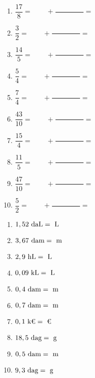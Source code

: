 \documentclass[a4paper,11pt,fleqn]{article}
\begin{document}

\begin{multicols}{2}
\begin{enumerate}[itemsep=2em]
	\item $ \dfrac{17}{8} = \phantom{0000} + \dfrac{\phantom{00000000}}{} =  $
	\item $ \dfrac{3}{2} = \phantom{0000} + \dfrac{\phantom{00000000}}{} =  $
	\item $ \dfrac{14}{5} = \phantom{0000} + \dfrac{\phantom{00000000}}{} =  $
	\item $ \dfrac{5}{4} = \phantom{0000} + \dfrac{\phantom{00000000}}{} =  $
	\item $ \dfrac{7}{4} = \phantom{0000} + \dfrac{\phantom{00000000}}{} =  $
	\item $ \dfrac{43}{10} = \phantom{0000} + \dfrac{\phantom{00000000}}{} =  $
	\item $ \dfrac{15}{4} = \phantom{0000} + \dfrac{\phantom{00000000}}{} =  $
	\item $ \dfrac{11}{5} = \phantom{0000} + \dfrac{\phantom{00000000}}{} =  $
	\item $ \dfrac{47}{10} = \phantom{0000} + \dfrac{\phantom{00000000}}{} =  $
	\item $ \dfrac{5}{2} = \phantom{0000} + \dfrac{\phantom{00000000}}{} =  $
\end{enumerate}
\end{multicols}


\begin{multicols}{2}
\begin{enumerate}[itemsep=2em]
	\item $ 1,52~\text{daL} = \dotfill ~\text{L}$
	\item $ 3,67~\text{dam} = \dotfill ~\text{m}$
	\item $ 2,9~\text{hL} = \dotfill ~\text{L}$
	\item $ 0,09~\text{kL} = \dotfill ~\text{L}$
	\item $ 0,4~\text{dam} = \dotfill ~\text{m}$
	\item $ 0,7~\text{dam} = \dotfill ~\text{m}$
	\item $ 0,1~\text{k€} = \dotfill ~\text{€}$
	\item $ 18,5~\text{dag} = \dotfill ~\text{g}$
	\item $ 0,5~\text{dam} = \dotfill ~\text{m}$
	\item $ 9,3~\text{dag} = \dotfill ~\text{g}$
\end{enumerate}
\end{multicols}
\end{document}
